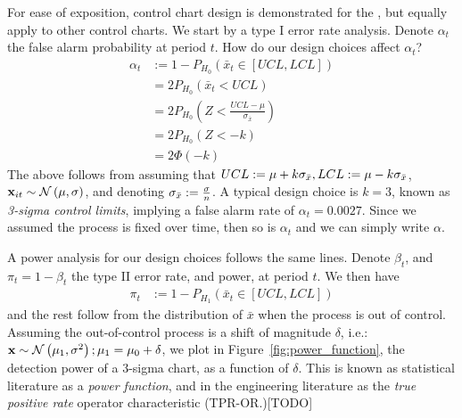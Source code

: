 For ease of exposition, control chart design is demonstrated for the \barxChart, but equally apply to other control charts.
We start by a type I error rate analysis. 
Denote $\alpha_t$ the false alarm probability at period $t$.
How do our design choices affect $\alpha_t$?
\begin{align}
	\alpha_t &:= 1-P_{H_0}(\bar{x}_t \in [UCL,LCL]) \\
	&= 2 P_{H_0}(\bar{x}_t<UCL) \\
	&= 2 P_{H_0}(Z<\frac{UCL-\mu}{\sigma_{\bar{x}}}) \\
	&= 2 P_{H_0}(Z < -k) \\
	&= 2 \Phi(-k)
\end{align}
The above follows from assuming that $UCL:=\mu + k \sigma_{\bar{x}}, LCL:= \mu - k \sigma_{\bar{x}}$, $\mathbf{x}_{it}\sim \mathcal{N}\left(\mu,\sigma\right)$, and denoting $\sigma_{\bar{x}}:= \frac{\sigma}{n}$.
A typical design choice is $k=3$, known as \emph{3-sigma control limits}, implying a false alarm rate of $\alpha_t=0.0027$.
Since we assumed the process is fixed over time, then so is $\alpha_t$ and we can simply write $\alpha$.

A power analysis for our design choices follows the same lines.
Denote $\beta_t$, and $\pi_t=1-\beta_t$ the type II error rate, and power, at period $t$.
We then have
\begin{align}
	\pi_t &:= 1-P_{H_1}(\bar{x}_t \in [UCL,LCL])
\end{align}
and the rest follow from the distribution of $\bar{x}$ when the process is out of control.
Assuming the out-of-control process is a shift of magnitude $\delta$, i.e.: $\mathbf{x} \sim \mathcal{N}\left(\mu_1,\sigma^2\right); \mu_1=\mu_0+\delta$, we plot in Figure~\ref{fig:power_function}, the detection power of a 3-sigma chart, as a function of $\delta$. 
This is known as statistical literature as a \emph{power function}, and in the engineering literature as the \emph{true positive rate} operator characteristic (TPR-OR.)[TODO]

